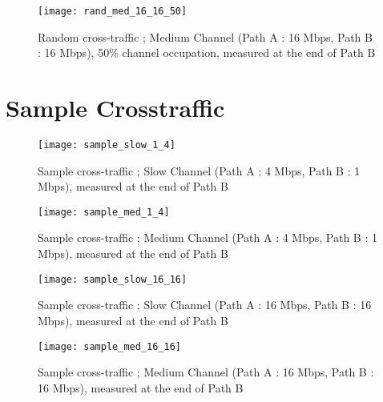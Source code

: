 \begin{figure}[!h]
\centering
\texttt{[image: rand\_med\_16\_16\_50]}
\caption{Random cross-traffic ; Medium Channel (Path A : 16 Mbps, Path B : 16 Mbps), 50\% channel occupation, measured at the end of Path B}
\end{figure}

\clearpage

\section{Sample Crosstraffic}

\begin{figure}[!h]
\centering
\texttt{[image: sample\_slow\_1\_4]}
\caption{Sample cross-traffic ; Slow Channel (Path A : 4 Mbps, Path B : 1 Mbps), measured at the end of Path B}
\end{figure}

\clearpage

\begin{figure}[!h]
\centering
\texttt{[image: sample\_med\_1\_4]}
\caption{Sample cross-traffic ; Medium Channel (Path A : 4 Mbps, Path B : 1 Mbps), measured at the end of Path B}
\end{figure}

\begin{figure}[!h]
\centering
\texttt{[image: sample\_slow\_16\_16]}
\caption{Sample cross-traffic ; Slow Channel (Path A : 16 Mbps, Path B : 16 Mbps), measured at the end of Path B}
\end{figure}

\begin{figure}[!h]
\centering
\texttt{[image: sample\_med\_16\_16]}
\caption{Sample cross-traffic ; Medium Channel (Path A : 16 Mbps, Path B : 16 Mbps), measured at the end of Path B}
\end{figure}